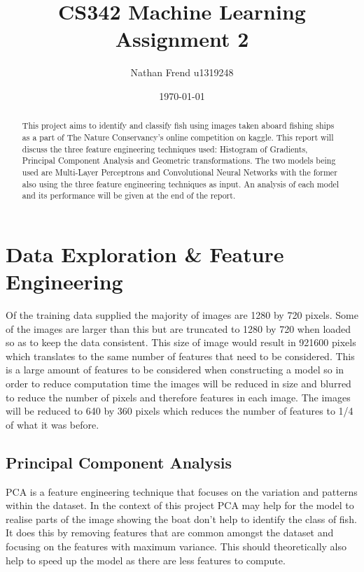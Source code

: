 \documentclass[notitlepage]{report}
\title{CS342 Machine Learning\\Assignment 2}
\author{Nathan Frend u1319248}
\date{\today}
\begin{document}
\maketitle

\begin{abstract}
This project aims to identify and classify fish using images taken aboard fishing ships as a part of The Nature Conservancy's online competition on kaggle. This report will discuss the three feature engineering techniques used: Histogram of Gradients,  Principal Component Analysis and Geometric transformations. The two models being used are Multi-Layer Perceptrons and Convolutional Neural Networks with the former also using the three feature engineering techniques as input. An analysis of each model and its performance will be given at the end of the report.
\end{abstract}

\tableofcontents

\chapter{Data Exploration \& Feature Engineering}
Of the training data supplied the majority of images are 1280 by 720 pixels. Some of the images are larger than this but are truncated to 1280 by 720 when loaded so as to keep the data consistent. This size of image would result in 921600 pixels which translates to the same number of features that need to be considered. This is a large amount of features to be considered when constructing a model so in order to reduce computation time the images will be reduced in size and blurred to reduce the number of pixels and therefore features in each image. The images will be reduced to 640 by 360 pixels which reduces the number of features to 1/4 of what it was before.

\section{Principal Component Analysis}
PCA is a feature engineering technique that focuses on the variation and patterns within the dataset. In the context of this project PCA may help for the model to realise parts of the image showing the boat don't help to identify the class of fish. It does this by removing features that are common amongst the dataset and focusing on the features with maximum variance. This should theoretically also help to speed up the model as there are less features to compute. 
\end{document}
